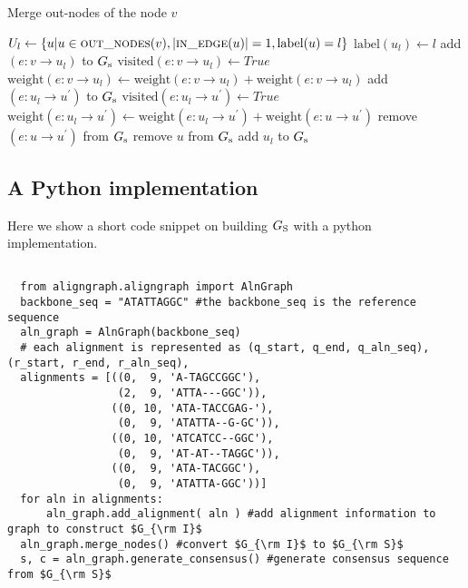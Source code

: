 \documentclass[11pt]{article}
\begin{document}
\begin{algorithm}[H]
\caption{Merge out-nodes of the node $v$}          
\label{algGSMergeOut}
\begin{algorithmic}[1]
	\State $U_l \gets \{u|u \in \Call{out\_nodes}{v}, |\Call{in\_edge}{u} | = 1, \textrm{label}(u) = l\}$
	\State $\textrm{label}(u_l) \gets l$
	\State add $(e:v \rightarrow u_l)$ to $G_{\rm s}$
	\State $\textrm{visited}(e:v \rightarrow u_l) \gets True$
		\State $\textrm{weight}(e:v \rightarrow u_l) \gets \textrm{weight}(e:v \rightarrow u_l) + \textrm{weight}(e:v \rightarrow u_l)$
			\State add $(e:u_l \rightarrow u^\prime)$ to $G_{\rm s}$
			\State $\textrm{visited}(e:u_l \rightarrow u^\prime) \gets True$
			\State $\textrm{weight}(e:u_l \rightarrow u^\prime) \gets \textrm{weight}(e:u_l \rightarrow u^\prime) + \textrm{weight}(e:u \rightarrow u^\prime)$
			\State remove $(e:u \rightarrow u^\prime)$ from $G_{\rm s}$ 
		\EndFor
		\State remove $u$ from $G_{\rm s}$ 
	\EndFor
	\State add $u_l$ to $G_{\rm s}$
	\State {} 
\EndFor
\EndFunction
\end{algorithmic}
\end{algorithm}  

\subsection{A Python implementation}

Here we show a short code snippet on building $G_{\rm S}$ with a python implementation.

\begin{verbatim}
                  
  from aligngraph.aligngraph import AlnGraph
  backbone_seq = "ATATTAGGC" #the backbone_seq is the reference sequence
  aln_graph = AlnGraph(backbone_seq) 
  # each alignment is represented as (q_start, q_end, q_aln_seq),(r_start, r_end, r_aln_seq),
  alignments = [((0,  9, 'A-TAGCCGGC'),   
                 (2,  9, 'ATTA---GGC')), 
                ((0, 10, 'ATA-TACCGAG-'), 
                 (0,  9, 'ATATTA--G-GC')), 
                ((0, 10, 'ATCATCC--GGC'), 
                 (0,  9, 'AT-AT--TAGGC')), 
                ((0,  9, 'ATA-TACGGC'),   
                 (0,  9, 'ATATTA-GGC'))]  
  for aln in alignments:
      aln_graph.add_alignment( aln ) #add alignment information to graph to construct $G_{\rm I}$
  aln_graph.merge_nodes() #convert $G_{\rm I}$ to $G_{\rm S}$
  s, c = aln_graph.generate_consensus() #generate consensus sequence from $G_{\rm S}$
\end{verbatim}
\end{document}
